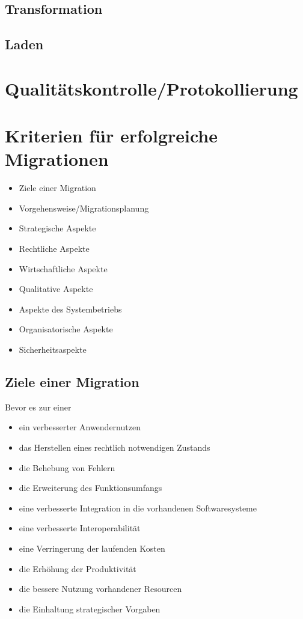 \subsection{Transformation}
\subsection{Laden}
 

\section{Qualitätskontrolle/Protokollierung}

\section{Kriterien für erfolgreiche Migrationen}
\begin{itemize}

  \item Ziele einer Migration
  \item Vorgehensweise/Migrationsplanung
  \item Strategische Aspekte
  \item Rechtliche Aspekte
  \item Wirtschaftliche Aspekte
  \item Qualitative Aspekte
  \item Aspekte des Systembetriebs
  \item Organisatorische Aspekte
  \item Sicherheitsaspekte
\end{itemize}
\subsection{Ziele einer Migration}
Bevor es zur einer 
\begin{itemize}
  \item ein verbesserter Anwendernutzen
  \item das Herstellen eines rechtlich notwendigen Zustands
  \item die Behebung von Fehlern
  \item die Erweiterung des Funktionsumfangs
  \item eine verbesserte Integration in die vorhandenen Softwaresysteme
  \item eine verbesserte Interoperabilität
  \item eine Verringerung der laufenden Kosten
  \item die Erhöhung der Produktivität
  \item die bessere Nutzung vorhandener Resourcen
  \item die Einhaltung strategischer Vorgaben
\end{itemize}
